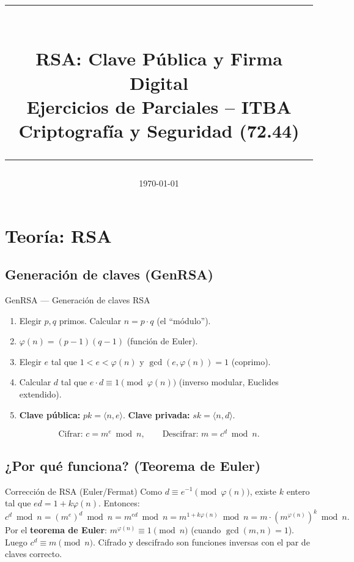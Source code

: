 \documentclass[11pt,a4paper]{article}
\title{
  \vspace{-1cm}
  {\color{itbaBlue}\rule{\linewidth}{2pt}}\\[0.3cm]
  {\Huge\bfseries\color{itbaBlue} RSA: Clave Pública y Firma Digital}\\[0.2cm]
  {\large\color{itbaCyan} Ejercicios de Parciales -- ITBA Criptografía y Seguridad (72.44)}\\[0.2cm]
  {\color{itbaBlue}\rule{\linewidth}{2pt}}
}
\author{}
\date{\today}
\begin{document}
\maketitle
\tableofcontents
\newpage

\section{Teoría: RSA}

\subsection{Generación de claves (GenRSA)}

\begin{teoriabox}{GenRSA --- Generación de claves RSA}
\begin{enumerate}
  \item Elegir $p, q$ primos. Calcular $n = p \cdot q$ (el ``módulo'').
  \item $\varphi(n) = (p-1)(q-1)$ (función de Euler).
  \item Elegir $e$ tal que $1 < e < \varphi(n)$ y $\gcd(e, \varphi(n)) = 1$ (coprimo).
  \item Calcular $d$ tal que $e \cdot d \equiv 1 \pmod{\varphi(n)}$ (inverso modular, Euclides extendido).
  \item \textbf{Clave pública:} $pk = \langle n, e \rangle$. \quad \textbf{Clave privada:} $sk = \langle n, d \rangle$.
\end{enumerate}
\[
  \text{Cifrar: } c = m^e \bmod n, \qquad \text{Descifrar: } m = c^d \bmod n.
\]
\end{teoriabox}

\subsection{¿Por qué funciona? (Teorema de Euler)}

\begin{teoriabox}{Corrección de RSA (Euler/Fermat)}
Como $d \equiv e^{-1} \pmod{\varphi(n)}$, existe $k$ entero tal que $ed = 1 + k\varphi(n)$. Entonces:
\[
  c^d \bmod n = (m^e)^d \bmod n = m^{ed} \bmod n = m^{1+k\varphi(n)} \bmod n = m \cdot (m^{\varphi(n)})^k \bmod n.
\]
Por el \textbf{teorema de Euler}: $m^{\varphi(n)} \equiv 1 \pmod{n}$ (cuando $\gcd(m,n)=1$). Luego $c^d \equiv m \pmod{n}$. Cifrado y descifrado son funciones inversas con el par de claves correcto.
\end{teoriabox}
\end{document}
